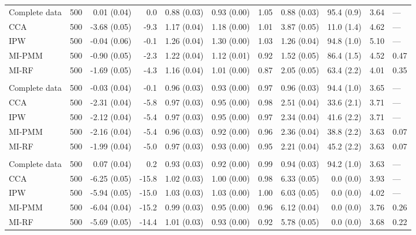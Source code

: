 \documentclass[11pt,a4paper]{article}
\begin{document}
\begin{landscape}
\begin{longtable}{l|rrrrrrrrrl}
\midrule\addlinespace[2.5pt]
\multicolumn{11}{l}{Stunting — MAR-strong 50\%} \\[2.5pt] 
\midrule\addlinespace[2.5pt]
Complete data & 500 & 0.01 (0.04) & 0.0 & 0.88 (0.03) & 0.93 (0.00) & 1.05 & 0.88 (0.03) & 95.4 (0.9) & 3.64 & — \\ 
CCA & 500 & -3.68 (0.05) & -9.3 & 1.17 (0.04) & 1.18 (0.00) & 1.01 & 3.87 (0.05) & 11.0 (1.4) & 4.62 & — \\ 
IPW & 500 & -0.04 (0.06) & -0.1 & 1.26 (0.04) & 1.30 (0.00) & 1.03 & 1.26 (0.04) & 94.8 (1.0) & 5.10 & — \\ 
MI-PMM & 500 & -0.90 (0.05) & -2.3 & 1.22 (0.04) & 1.12 (0.01) & 0.92 & 1.52 (0.05) & 86.4 (1.5) & 4.52 & 0.47 \\ 
MI-RF & 500 & -1.69 (0.05) & -4.3 & 1.16 (0.04) & 1.01 (0.00) & 0.87 & 2.05 (0.05) & 63.4 (2.2) & 4.01 & 0.35 \\ 
\midrule\addlinespace[2.5pt]
\multicolumn{11}{l}{Stunting — MNAR 10\%} \\[2.5pt] 
\midrule\addlinespace[2.5pt]
Complete data & 500 & -0.03 (0.04) & -0.1 & 0.96 (0.03) & 0.93 (0.00) & 0.97 & 0.96 (0.03) & 94.4 (1.0) & 3.65 & — \\ 
CCA & 500 & -2.31 (0.04) & -5.8 & 0.97 (0.03) & 0.95 (0.00) & 0.98 & 2.51 (0.04) & 33.6 (2.1) & 3.71 & — \\ 
IPW & 500 & -2.12 (0.04) & -5.4 & 0.97 (0.03) & 0.95 (0.00) & 0.97 & 2.34 (0.04) & 41.6 (2.2) & 3.71 & — \\ 
MI-PMM & 500 & -2.16 (0.04) & -5.4 & 0.96 (0.03) & 0.92 (0.00) & 0.96 & 2.36 (0.04) & 38.8 (2.2) & 3.63 & 0.07 \\ 
MI-RF & 500 & -1.99 (0.04) & -5.0 & 0.97 (0.03) & 0.93 (0.00) & 0.95 & 2.21 (0.04) & 45.2 (2.2) & 3.63 & 0.07 \\ 
\midrule\addlinespace[2.5pt]
\multicolumn{11}{l}{Stunting — MNAR 30\%} \\[2.5pt] 
\midrule\addlinespace[2.5pt]
Complete data & 500 & 0.07 (0.04) & 0.2 & 0.93 (0.03) & 0.92 (0.00) & 0.99 & 0.94 (0.03) & 94.2 (1.0) & 3.63 & — \\ 
CCA & 500 & -6.25 (0.05) & -15.8 & 1.02 (0.03) & 1.00 (0.00) & 0.98 & 6.33 (0.05) & 0.0 (0.0) & 3.93 & — \\ 
IPW & 500 & -5.94 (0.05) & -15.0 & 1.03 (0.03) & 1.03 (0.00) & 1.00 & 6.03 (0.05) & 0.0 (0.0) & 4.02 & — \\ 
MI-PMM & 500 & -6.04 (0.04) & -15.2 & 0.99 (0.03) & 0.95 (0.00) & 0.96 & 6.12 (0.04) & 0.0 (0.0) & 3.76 & 0.26 \\ 
MI-RF & 500 & -5.69 (0.05) & -14.4 & 1.01 (0.03) & 0.93 (0.00) & 0.92 & 5.78 (0.05) & 0.0 (0.0) & 3.68 & 0.22 \\ 

\end{longtable}
\end{landscape}
\end{document}
